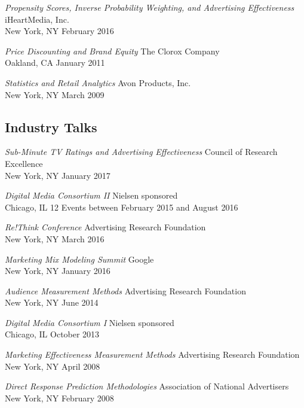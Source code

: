 \begin{zitemize}

\vspace{0.2em}
\item \textit{Propensity Scores, Inverse Probability Weighting, and Advertising Effectiveness} \hfill  iHeartMedia, Inc. \\
New York, NY \hfill February 2016
\vspace{0.2em}
\item \textit{Price Discounting and Brand Equity} \hfill The Clorox Company \\ 
Oakland, CA \hfill January 2011
\vspace{0.2em}
\item \textit{Statistics and Retail Analytics} \hfill Avon Products, Inc. \\
New York, NY \hfill March 2009

\end{zitemize}


\subsection{{Industry Talks}}
\begin{zitemize}
\item \textit{Sub-Minute TV Ratings and Advertising Effectiveness} \hfill Council of Research Excellence \\
New York, NY \hfill January 2017
\vspace{0.2em}
\item \textit{Digital Media Consortium II} \hfill  Nielsen sponsored \\
Chicago, IL \hfill 12 Events between February 2015 and August 2016 
\newpage
\item \textit{Re!Think Conference} \hfill  Advertising Research Foundation \\
New York, NY \hfill  March 2016
\vspace{0.2em}
\item \textit{Marketing Mix Modeling Summit} \hfill Google \\
New York, NY \hfill  January 2016
\vspace{0.2em}
\item \textit{Audience Measurement Methods} \hfill Advertising Research Foundation \\
New York, NY \hfill June 2014
\vspace{0.2em}
\item \textit{Digital Media Consortium I} \hfill Nielsen sponsored \\
Chicago, IL \hfill  October 2013
\vspace{0.2em}
\item \textit{Marketing Effectiveness Measurement Methods} \hfill  Advertising Research Foundation \\
New York, NY \hfill  April 2008
\vspace{0.2em}
\item \textit{Direct Response Prediction Methodologies} \hfill  Association of National Advertisers \\
New York, NY \hfill February 2008
\end{zitemize}

